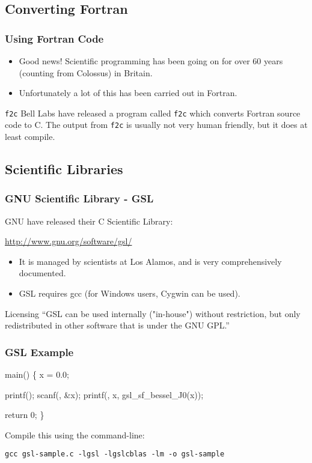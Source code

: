 \documentclass[smaller,table]{beamer} %
\begin{document}
\subsection{Converting Fortran}
\begin{frame}
\frametitle{Using Fortran Code}
\begin{itemize}
\item Good news! Scientific programming has been going on for over 60 years (counting from Colossus) in Britain.
\item Unfortunately a lot of this has been carried out in Fortran.
\end{itemize}
\begin{block}{\tt f2c}
Bell Labs have released a program called {\tt f2c} which converts Fortran source code to C. The output from {\tt f2c} is usually not very human friendly, but it does at least compile.
\end{block}
\end{frame}

\subsection{Scientific Libraries}
\begin{frame}
\frametitle{GNU Scientific Library - GSL}
GNU have released their C Scientific Library:
\begin{center}
\url{http://www.gnu.org/software/gsl/}
\end{center}

\begin{itemize}
\item It is managed by scientists at Los Alamos, and is very comprehensively documented.
\item GSL requires gcc (for Windows users, Cygwin can be used).
\end{itemize}

\begin{alertblock}{Licensing}
``GSL can be used internally ("in-house") without restriction, but only redistributed in other software that is under the GNU GPL.''
\end{alertblock}
\end{frame}

\begin{frame}[fragile]
\frametitle{GSL Example}
\vspace{-0.2in}
\begin{semiverbatim}
\small
{} 
 

 main()
\{
    x = 0.0;

   printf();
   scanf(, \&x);
   printf(, x, gsl\_sf\_bessel\_J0(x));

   return 0;
\}
\end{semiverbatim}
Compile this using the command-line:
\begin{alertblock}
\tt gcc gsl-sample.c -lgsl  -lgslcblas -lm -o gsl-sample
\end{alertblock}
\end{frame}
\end{document}
